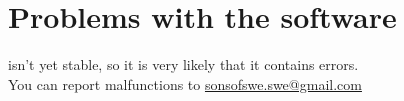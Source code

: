 \section{Problems with the software}
\project{} isn't yet stable, so it is very likely that it contains errors.\\
You can report malfunctions to  {\href{mailto:sonsofswe.swe@gmail.com}{sonsofswe.swe@gmail.com}} 